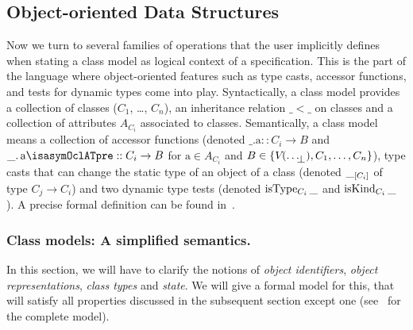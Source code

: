 \subsection{Object-oriented Data Structures}%
Now we turn to several families of operations that the user implicitly defines
when stating a class model as logical context of a specification. This is the
part of the language where object-oriented features such as type casts, accessor
functions, and tests for dynamic types come into play. Syntactically, a class
model provides a collection of classes ($C_1$, \ldots, $C_n$),
an inheritance relation $\_ < \_$ on
classes and a collection of attributes $A_{C_i}$ associated to classes.  Semantically,
a class model means a collection of accessor functions (denoted $\_\text{.a}::C_i
\rightarrow B$ and $\getAttrib{\_}{a\isasymOclATpre}::C_i \rightarrow B$ for
$\text{a}\in A_{C_i}$ and $B\in \{\V{}{\up{\ldots}}, C_1, \ldots, C_n\}$),
type casts that can change the static type of an object of a class
(denoted $\typeCast{\_}{\text{$C_i$}}$ of type $C_j \rightarrow C_i$) and
two dynamic type tests
(denoted $\isType{\text{$C_i$}}{\_}$ and $\isKind{\text{$C_i$}}{\_}$ ).
A precise formal definition can be found in~\cite{brucker.ea:semantics:2009}.

\subsubsection{Class models: A simplified semantics.}
In this section, we will have to clarify the notions of \emph{object
  identifiers}, \emph{object representations}, \emph{class types} and
\emph{state}. We will give a formal model for this, that will satisfy all
properties discussed in the subsequent section except one
(see~\cite{brucker.ea:extensible:2008-b} for the complete model).

